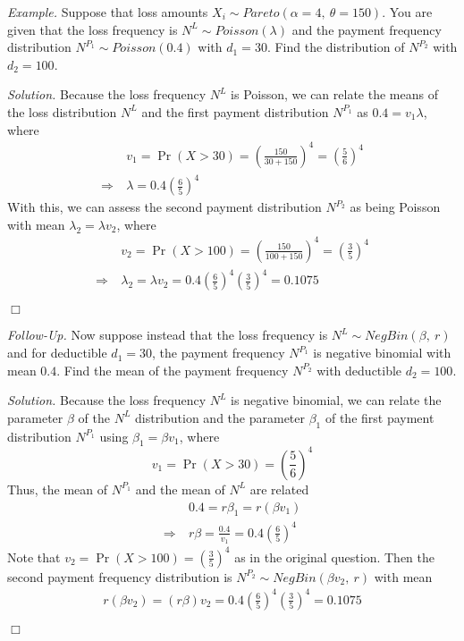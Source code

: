 \documentclass[12pt,letterpaper]{article}
\begin{document}


\bigskip

\noindent \textit{Example.} Suppose that loss amounts $X_i\sim Pareto(\alpha=4,\ \theta=150)$. You are given that the loss frequency is $N^L\sim Poisson(\lambda)$ and the payment frequency distribution $N^{P_1}\sim Poisson (0.4)$ with $d_1=30$. Find the distribution of $N^{P_2}$ with $d_2=100$.

\bigskip

\noindent \textit{Solution.} Because the loss frequency $N^L$ is Poisson, we can relate the means of the loss distribution $N^L$ and the first payment distribution $N^{P_1}$ as $0.4 = v_1 \lambda$, where
\begin{align*}
&v_1 = \Pr(X > 30) = \left( \frac{150}{30+150}\right)^4=\left( \frac{5}{6}\right)^4 \\
\Rightarrow \ & \lambda = 0.4 \left( \frac{6}{5} \right)^4
\end{align*}
With this, we can assess the second payment distribution $N^{P_2}$ as being Poisson with mean $\lambda_2 = \lambda v_2$, where
\begin{align*}
& v_2 = \Pr(X>100)=\left( \frac{150}{100+150}\right)^4=\left( \frac{3}{5}\right)^4 \\
\Rightarrow \ & \lambda_2 = \lambda v_2 = 0.4\left( \frac{6}{5} \right)^4 \left( \frac{3}{5} \right)^4 = 0.1075
\end{align*}
\begin{flushright}$\Box$\end{flushright}

\noindent \textit{Follow-Up.} Now suppose instead that the loss frequency is $N^L \sim NegBin(\beta,\ r)$ and for deductible $d_1=30$, the payment frequency $N^{P_1}$ is negative binomial with mean $0.4$. Find the mean of the payment frequency $N^{P_2}$ with deductible $d_2=100$.

\bigskip

\noindent \textit{Solution.} Because the loss frequency $N^L$ is negative binomial, we can relate the parameter $\beta$ of the $N^L$ distribution and the parameter $\beta_1$ of the first payment distribution $N^{P_1}$ using $\beta_1 = \beta v_1$, where $$v_1 = \Pr(X > 30) = \left( \frac{5}{6} \right)^4$$ Thus, the mean of $N^{P_1}$ and the mean of $N^L$ are related
\begin{align*}
&0.4 =  r \beta_1 = r \left(\beta v_1\right) \\
\Rightarrow \ & r\beta = \frac{0.4}{v_1} = 0.4 \left(\frac{6}{5} \right)^4
\end{align*}
Note that $v_2 = \Pr(X > 100) = \left( \frac{3}{5}\right)^4$ as in the original question. Then the second payment frequency distribution is $N^{P_2} \sim NegBin(\beta v_2, \ r)$ with mean
\begin{align*}
r (\beta v_2) = (r \beta) v_2 = 0.4 \left( \frac{6}{5}\right)^4 \left( \frac{3}{5} \right)^4 = 0.1075
\end{align*}
\begin{flushright}$\Box$\end{flushright}
\bigskip
\end{document}
